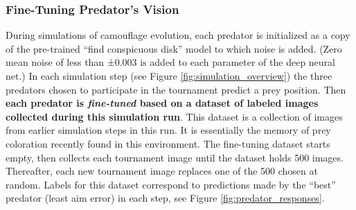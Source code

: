 \documentclass[acmtog,
    anonymous,
    review
    ]{acmart}
\newcommand{\jargon}[1]{\textit{#1}}
\begin{document}
\subsubsection{Fine-Tuning Predator's Vision}
During simulations of camouflage evolution, each predator is initialized as a copy of the pre-trained “find conspicuous disk” model to which noise is added. (Zero mean noise of less than ±0.003 is added to each parameter of the deep neural net.) In each simulation step (see Figure \ref{fig:simulation_overview}) the three predators chosen to participate in the tournament predict a prey position. Then \textbf{each predator is \jargon{fine-tuned} based on a dataset of labeled images collected during this simulation run}. This dataset is a collection of images from earlier simulation steps in this run. It is essentially the memory of prey coloration recently found in this environment. The fine-tuning dataset starts empty, then collects each tournament image until the dataset holds 500 images. Thereafter, each new tournament image replaces one of the 500 chosen at random. Labels for this dataset correspond to predictions made by the “best” predator (least aim error) in each step, see Figure \ref{fig:predator_responses}.
\par

\end{document}
